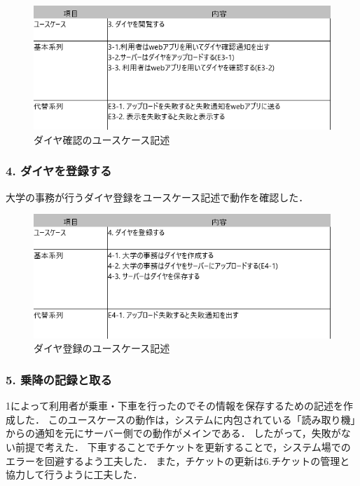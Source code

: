\documentclass[documentclass]{jsarticle}
\begin{document}
\begin{figure}[H]
  \begin{center}
    \includegraphics*[scale=0.6]{figure/4-3.png}
  \end{center}
  \caption{ダイヤ確認のユースケース記述}
  \label{fig:4-3}
\end{figure}

\subsubsection*{4. ダイヤを登録する}
大学の事務が行うダイヤ登録をユースケース記述で動作を確認した．

\begin{figure}[H]
  \begin{center}
    \includegraphics*[scale=0.6]{figure/4-4.png}
  \end{center}
  \caption{ダイヤ登録のユースケース記述}
  \label{fig:4-4}
\end{figure}

\subsubsection*{5. 乗降の記録と取る}
1によって利用者が乗車・下車を行ったのでその情報を保存するための記述を作成した．
このユースケースの動作は，システムに内包されている「読み取り機」からの通知を元にサーバー側での動作がメインである．
したがって，失敗がない前提で考えた．
下車することでチケットを更新することで，システム場でのエラーを回避するよう工夫した．
また，チケットの更新は6.チケットの管理と協力して行うように工夫した．
\end{document}
